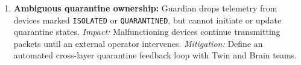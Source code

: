 \documentclass[11pt,a4paper]{article}
\begin{document}
\begin{enumerate}[leftmargin=*,itemsep=2pt,topsep=2pt]
  \item \textbf{Ambiguous quarantine ownership:} Guardian drops telemetry from devices marked \texttt{ISOLATED} or \texttt{QUARANTINED}, but cannot initiate or update quarantine states. \textit{Impact:} Malfunctioning devices continue transmitting packets until an external operator intervenes. \textit{Mitigation:} Define an automated cross-layer quarantine feedback loop with Twin and Brain teams.
\end{enumerate}
\end{document}
